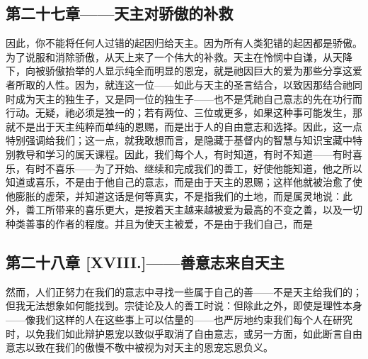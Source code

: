 
\subsection{第二十七章——天主对骄傲的补救}

因此，你不能将任何人过错的起因归给天主。因为所有人类犯错的起因都是骄傲。为了说服和消除骄傲，从天上来了一个伟大的补救。天主在怜悯中自谦，从天降下，向被骄傲抬举的人显示纯全而明显的恩宠，就是祂因巨大的爱为那些分享这爱者所取的人性。因为，就连这一位——如此与天主的圣言结合，以致因那结合祂同时成为天主的独生子，又是同一位的独生子——也不是凭祂自己意志的先在功行而行动。无疑，祂必须是独一的；若有两位、三位或更多，如果这种事可能发生，那就不是出于天主纯粹而单纯的恩赐，而是出于人的自由意志和选择。因此，这一点特别强调给我们；这一点，就我敢想而言，是隐藏于基督内的智慧与知识宝藏中特别教导和学习的属天课程。因此，我们每个人，有时知道，有时不知道——有时喜乐，有时不喜乐——为了开始、继续和完成我们的善工，好使他能知道，他之所以知道或喜乐，不是由于他自己的意志，而是由于天主的恩赐；这样他就被治愈了使他膨胀的虚荣，并知道这话是何等真实，不是指我们的土地，而是属灵地说：此外，善工所带来的喜乐更大，是按着天主越来越被爱为最高的不变之善，以及一切种类善事的作者的程度。并且为使天主被爱，不是由于我们自己，而是\par


\subsection{第二十八章 [XVIII.]——善意志来自天主}

然而，人们正努力在我们的意志中寻找一些属于自己的善——不是天主给我们的；但我无法想象如何能找到。宗徒论及人的善工时说：但除此之外，即使是理性本身——像我们这样的人在这些事上可以估量的——也严厉地约束我们每个人在研究时，以免我们如此辩护恩宠以致似乎取消了自由意志，或另一方面，如此断言自由意志以致在我们的傲慢不敬中被视为对天主的恩宠忘恩负义。\par


